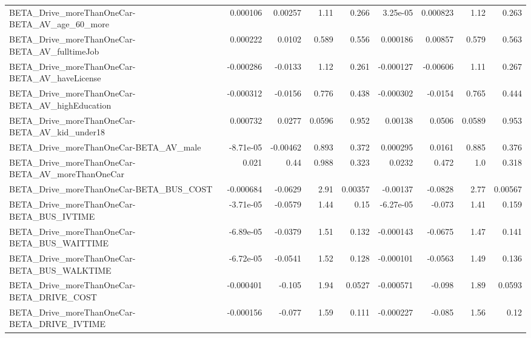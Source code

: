 \begin{tabular}{lrrrrrrrr}
BETA\_Drive\_moreThanOneCar-BETA\_AV\_age\_60\_more      &    0.000106 &      0.00257 &     1.11 &    0.266 &   3.25e-05 &    0.000823 &         1.12 &         0.263 \\
BETA\_Drive\_moreThanOneCar-BETA\_AV\_fulltimeJob      &    0.000222 &       0.0102 &    0.589 &    0.556 &   0.000186 &     0.00857 &        0.579 &         0.563 \\
BETA\_Drive\_moreThanOneCar-BETA\_AV\_haveLicense      &   -0.000286 &      -0.0133 &     1.12 &    0.261 &  -0.000127 &    -0.00606 &         1.11 &         0.267 \\
BETA\_Drive\_moreThanOneCar-BETA\_AV\_highEducation    &   -0.000312 &      -0.0156 &    0.776 &    0.438 &  -0.000302 &     -0.0154 &        0.765 &         0.444 \\
BETA\_Drive\_moreThanOneCar-BETA\_AV\_kid\_under18      &    0.000732 &       0.0277 &   0.0596 &    0.952 &    0.00138 &      0.0506 &       0.0589 &         0.953 \\
BETA\_Drive\_moreThanOneCar-BETA\_AV\_male             &   -8.71e-05 &     -0.00462 &    0.893 &    0.372 &   0.000295 &      0.0161 &        0.885 &         0.376 \\
BETA\_Drive\_moreThanOneCar-BETA\_AV\_moreThanOneCar   &       0.021 &         0.44 &    0.988 &    0.323 &     0.0232 &       0.472 &          1.0 &         0.318 \\
BETA\_Drive\_moreThanOneCar-BETA\_BUS\_COST            &   -0.000684 &      -0.0629 &     2.91 &  0.00357 &   -0.00137 &     -0.0828 &         2.77 &       0.00567 \\
BETA\_Drive\_moreThanOneCar-BETA\_BUS\_IVTIME          &   -3.71e-05 &      -0.0579 &     1.44 &     0.15 &  -6.27e-05 &      -0.073 &         1.41 &         0.159 \\
BETA\_Drive\_moreThanOneCar-BETA\_BUS\_WAITTIME        &   -6.89e-05 &      -0.0379 &     1.51 &    0.132 &  -0.000143 &     -0.0675 &         1.47 &         0.141 \\
BETA\_Drive\_moreThanOneCar-BETA\_BUS\_WALKTIME        &   -6.72e-05 &      -0.0541 &     1.52 &    0.128 &  -0.000101 &     -0.0563 &         1.49 &         0.136 \\
BETA\_Drive\_moreThanOneCar-BETA\_DRIVE\_COST          &   -0.000401 &       -0.105 &     1.94 &   0.0527 &  -0.000571 &      -0.098 &         1.89 &        0.0593 \\
BETA\_Drive\_moreThanOneCar-BETA\_DRIVE\_IVTIME        &   -0.000156 &       -0.077 &     1.59 &    0.111 &  -0.000227 &      -0.085 &         1.56 &          0.12 \\

\end{tabular}
